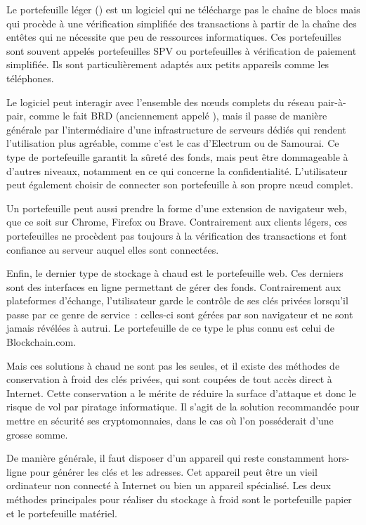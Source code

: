 Le portefeuille léger () est un logiciel qui ne télécharge pas le chaîne de blocs mais qui procède à une vérification simplifiée des transactions à partir de la chaîne des entêtes qui ne nécessite que peu de ressources informatiques. Ces portefeuilles sont souvent appelés portefeuilles SPV ou portefeuilles à vérification de paiement simplifiée. Ils sont particulièrement adaptés aux petits appareils comme les téléphones. 

Le logiciel peut interagir avec l'ensemble des nœuds complets du réseau pair-à-pair, comme le fait BRD (anciennement appelé ), mais il passe de manière générale par l'intermédiaire d'une infrastructure de serveurs dédiés qui rendent l'utilisation plus agréable, comme c'est le cas d'Electrum ou de Samourai. Ce type de portefeuille garantit la sûreté des fonds, mais peut être dommageable à d'autres niveaux, notamment en ce qui concerne la confidentialité. L'utilisateur peut également choisir de connecter son portefeuille à son propre nœud complet.

Un portefeuille peut aussi prendre la forme d'une extension de navigateur web, que ce soit sur Chrome, Firefox ou Brave. Contrairement aux clients légers, ces portefeuilles ne procèdent pas toujours à la vérification des transactions et font confiance au serveur auquel elles sont connectées.

Enfin, le dernier type de stockage à chaud est le portefeuille web. Ces derniers sont des interfaces en ligne permettant de gérer des fonds. Contrairement aux plateformes d'échange, l'utilisateur garde le contrôle de ses clés privées lorsqu'il passe par ce genre de service~: celles-ci sont gérées par son navigateur et ne sont jamais révélées à autrui. Le portefeuille de ce type le plus connu est celui de Blockchain.com.


Mais ces solutions à chaud ne sont pas les seules, et il existe des méthodes de conservation à froid des clés privées, qui sont coupées de tout accès direct à Internet. Cette conservation a le mérite de réduire la surface d'attaque et donc le risque de vol par piratage informatique. Il s'agit de la solution recommandée pour mettre en sécurité ses cryptomonnaies, dans le cas où l'on posséderait d'une grosse somme.

De manière générale, il faut disposer d'un appareil qui reste constamment hors-ligne pour générer les clés et les adresses. Cet appareil peut être un vieil ordinateur non connecté à Internet ou bien un appareil spécialisé. Les deux méthodes principales pour réaliser du stockage à froid sont le portefeuille papier et le portefeuille matériel.

